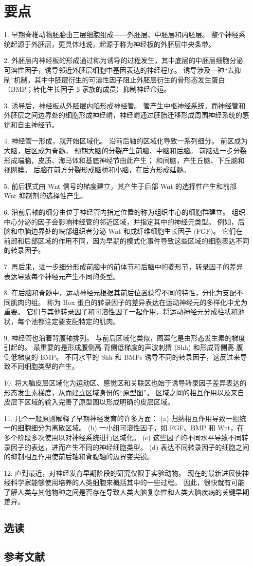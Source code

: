 \section{要点}
1. 早期脊椎动物胚胎由三层细胞组成——外胚层、中胚层和内胚层。 整个神经系统起源于外胚层，更具体地说，起源于称为神经板的外胚层中央条带。 

2. 外胚层内神经板的形成通过称为诱导的过程发生，其中底层的中胚层细胞分泌可溶性因子，诱导邻近外胚层细胞中基因表达的神经程序。 诱导涉及一种“去抑制”机制，其中中胚层衍生的可溶性因子阻止外胚层衍生的骨形态发生蛋白（BMP；转化生长因子 β 家族的成员）抑制神经命运。 

3. 诱导后，神经板从外胚层内陷形成神经管。 管产生中枢神经系统，而神经管和外胚层之间边界处的细胞形成神经嵴，神经嵴通过胚胎迁移形成周围神经系统的感觉和自主神经节。 

4. 神经管一形成，就开始区域化。 沿前后轴的区域化导致一系列细分。 前区成为大脑，后区成为脊髓。 预期大脑的分裂产生前脑、中脑和后脑。 前脑进一步分裂形成端脑，皮质、海马体和基底神经节由此产生； 和间脑，产生丘脑、下丘脑和视网膜。 后脑在前方分裂形成脑桥和小脑，在后方形成延髓。 

5. 前后模式由 Wnt 信号的梯度建立，其产生于后部 Wnt 的选择性产生和前部 Wnt 抑制剂的选择性产生。 

6. 沿前后轴的细分由位于神经管内指定位置的称为组织中心的细胞群建立。 组织中心分泌的因子会影响神经管的邻近区域，并指定其中的神经元类型。 例如，后脑和中脑边界处的峡部组织者分泌 Wnt 和成纤维细胞生长因子 (FGF)。 它们在前部和后部区域的作用不同，因为早期的模式化事件导致这些区域的细胞表达不同的转录因子。

7. 再后来，进一步细分形成前脑中的前体节和后脑中的菱形节，转录因子的差异表达导致每个神经元产生不同的类型。 

8. 在后脑和脊髓中，运动神经元根据其前后位置获得不同的特性，分化为支配不同肌肉的组。 称为 Hox 蛋白的转录因子的差异表达在运动神经元的多样化中尤为重要。 它们与其他转录因子和可溶性因子一起作用，将运动神经元分成柱状和池状，每个池都注定要支配特定的肌肉。 

9. 神经管也沿着背腹轴排列。 与前后区域化类似，图案化是由形态发生素的梯度引起的。 最重要的是形成腹侧高-背侧低梯度的声波刺猬 (Shh) 和形成背侧高-腹侧低梯度的 BMP。 不同水平的 Shh 和 BMPs 诱导不同的转录因子，这反过来导致不同细胞类型的产生。 

10. 将大脑皮层区域化为运动区、感觉区和关联区也始于诱导转录因子差异表达的形态发生素梯度，从而建立区域身份的“原型图”。 区域之间的相互作用以及来自皮层下区域的输入完善了原型图以形成明确的皮层区域。 

11. 几个一般原则解释了早期神经发育的许多方面： (a) 归纳相互作用导致一组统一的细胞细分为离散区域。 (b) 一小组可溶性因子，如 FGF、BMP 和 Wnt，在多个阶段多次使用以对神经系统进行区域化。 (c) 这些因子的不同水平导致不同转录因子的表达，进而产生不同的神经细胞类型。 (d) 表达不同转录因子的细胞之间的抑制相互作用使前后轴和背腹轴的边界变尖锐。 

12. 直到最近，对神经发育早期阶段的研究仅限于实验动物。 现在的最新进展使神经科学家能够使用培养的人类细胞来概括其中的一些过程。 因此，很快就有可能了解人类与其他物种之间是否存在导致人类大脑复杂性和人类大脑疾病的关键早期差异。

\subsection{选读}
\subsection{参考文献}
